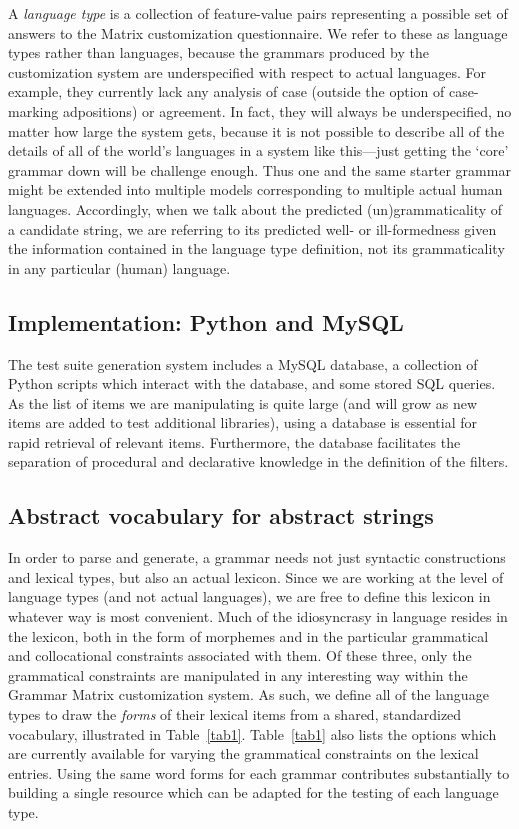 \documentclass[11pt]{article}
\begin{document}
A {\it language type} is a collection of feature-value pairs
representing a possible set of answers to the Matrix customization
questionnaire.  We refer to these as language types rather than
languages, because the grammars produced by the customization system
are underspecified with respect to actual languages.  For example,
they currently lack any analysis of case (outside the option of
case-marking adpositions) or agreement.  In fact, they will always be
underspecified, no matter how large the system gets, because it is not
possible to describe all of the details of all of the world's
languages in a system like this---just getting the `core' grammar down
will be challenge enough.  Thus one and the same starter grammar might
be extended into multiple models corresponding to multiple actual
human languages. Accordingly, when we talk about the predicted
(un)grammaticality of a candidate string, we are referring to its
predicted well- or ill-formedness given the information contained in
the language type definition, not its grammaticality in any particular
(human) language.

\subsection{Implementation: Python and MySQL}

The test suite generation system includes a MySQL database, a collection
of Python scripts which interact with the database, and some stored
SQL queries.  As the list of items we are manipulating is quite large
(and will grow as new items are added to test additional libraries),
using a database is essential for rapid retrieval of relevant items.
Furthermore, the database facilitates the separation of procedural
and declarative knowledge in the definition of the filters.

\subsection{Abstract vocabulary for abstract strings}

In order to parse and generate, a grammar needs not just syntactic
constructions and lexical types, but also an actual lexicon.  Since we
are working at the level of language types (and not actual languages),
we are free to define this lexicon in whatever way is most convenient.
Much of the idiosyncrasy in language resides in the lexicon, both in
the form of morphemes and in the particular grammatical and
collocational constraints associated with them.  Of these three, only
the grammatical constraints are manipulated in any interesting way
within the Grammar Matrix customization system.  As such, we define
all of the language types to draw the {\it forms} of their lexical
items from a shared, standardized vocabulary, illustrated in
Table~\ref{tab1}.  Table~\ref{tab1} also lists the options which are
currently available for varying the grammatical constraints on the
lexical entries.  Using the same word forms for each grammar
contributes substantially to building a single resource which can be
adapted for the testing of each language type.
\end{document}
